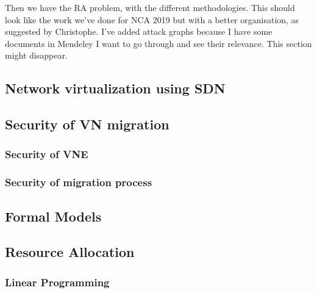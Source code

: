 \documentclass[a4paper, 11pt]{article}
\begin{document}
Then we have the RA problem, with the different methodologies. This should look like the work we've done for NCA 2019 but with a better organisation, as suggested by Christophe. I've added attack graphs because I have some documents in Mendeley I want to go through and see their relevance. This section might disappear.


\subsection{Network virtualization using SDN}












\subsection{Security of VN migration}

\subsubsection{Security of VNE}
\cite{Wang2015,safevne-bays2012,Boutigny2018,Bays2014}
\subsubsection{Security of migration process}


\subsection{Formal Models}
\cite{M2D2-Morin2002,AICPub2006:2015,HLPSL-Chevalier2004,Marsalek2018,ISO/IEC270012013,abstraction-reitblatt2012,validation-naylor1967,M4D4-Morin2008,CSP-Schneider1996}





\subsection{Resource Allocation}
\subsubsection{Linear Programming}
\cite{Stott1979,ofdma-awad2008,monitoring-nash1977,lpmedical-kwak1997,wirelessvirt-moubayed2015,transportation-wey2007,Ye2017a,book-LP,Papagianni2013}
\end{document}
